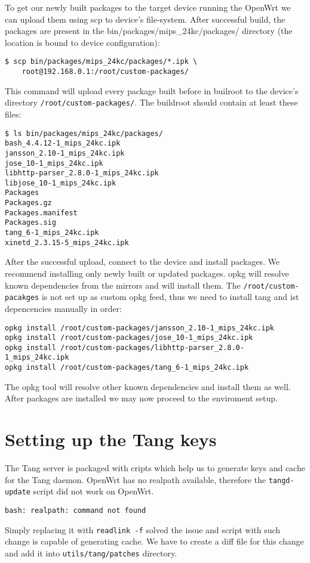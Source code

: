 To get our newly built packages to the target device running the OpenWrt we can upload them using scp to device's file-system.
After successful build, the packages are present in the bin/packages/mips\_24kc/packages/ directory (the location is bound to device configuration):
\begin{lstlisting}[columns=fixed,basicstyle=\ttfamily\footnotesize,tabsize=4,backgroundcolor=\color{yellow!10}]
$ scp bin/packages/mips_24kc/packages/*.ipk \
    root@192.168.0.1:/root/custom-packages/
\end{lstlisting}
This command will upload every package built before in builroot to the device's directory {\tt /root/custom-packages/}.
The buildroot should contain at least these files:
\begin{lstlisting}[columns=fixed,basicstyle=\ttfamily\footnotesize,tabsize=4,backgroundcolor=\color{yellow!10}]
$ ls bin/packages/mips_24kc/packages/
bash_4.4.12-1_mips_24kc.ipk
jansson_2.10-1_mips_24kc.ipk
jose_10-1_mips_24kc.ipk
libhttp-parser_2.8.0-1_mips_24kc.ipk
libjose_10-1_mips_24kc.ipk
Packages
Packages.gz
Packages.manifest
Packages.sig
tang_6-1_mips_24kc.ipk
xinetd_2.3.15-5_mips_24kc.ipk
\end{lstlisting}
After the successful upload, connect to the device and install packages.
We recommend installing only newly built or updated packages.
opkg will resolve known dependencies from the mirrors and will install them.
The {\tt /root/custom-pacakges} is not set up as custom opkg feed, thus we need to install tang and ist depencencies manually in order:
\begin{lstlisting}[columns=fixed,basicstyle=\ttfamily\footnotesize,tabsize=4,backgroundcolor=\color{yellow!10}]
opkg install /root/custom-packages/jansson_2.10-1_mips_24kc.ipk
opkg install /root/custom-packages/jose_10-1_mips_24kc.ipk
opkg install /root/custom-packages/libhttp-parser_2.8.0-1_mips_24kc.ipk
opkg install /root/custom-packages/tang_6-1_mips_24kc.ipk
\end{lstlisting}
The opkg tool will resolve other known dependencies and install them as well.
After packages are installed we may now proceed to the enviroment setup.



\section{Setting up the Tang keys}
The Tang server is packaged with cripts which help us to generate keys and cache for the Tang daemon.
OpenWrt has no realpath available, therefore the {\tt tangd-update} script did not work on OpenWrt.
\begin{lstlisting}[columns=fixed,basicstyle=\ttfamily\footnotesize,tabsize=4,backgroundcolor=\color{yellow!10}]
bash: realpath: command not found
\end{lstlisting}
Simply replacing it with {\tt readlink -f} solved the issue and script with such change is capable of generating cache.
We have to create a diff file for this change and add it into {\tt utils/tang/patches} directory.

